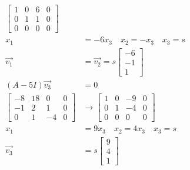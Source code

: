 \documentclass{math}
\begin{document}
\begin{enumerate}[(a)]
\begin{align*}
\begin{bmatrix}
      1 & 0 & 6 & 0 \\
      0 & 1 & 1 & 0 \\
      0 & 0 & 0 & 0
    \end{bmatrix} \\
    x_1 &= -6x_3 \quad x_2 = -x_3 \quad x_3 = s \\
    \vec{v_1} &= \vec{v_2} = s\begin{bmatrix}-6 \\ -1 \\ 1\end{bmatrix} \\
    (A-5I)\vec{v_3} &= 0 \\
    \begin{bmatrix}
      -8 & 18 & 0 & 0 \\
      -1 & 2 & 1 & 0 \\
      0 & 1 & -4 & 0
    \end{bmatrix} &\to \begin{bmatrix}
      1 & 0 & -9 & 0 \\
      0 & 1 & -4 & 0 \\
      0 & 0 & 0 & 0
    \end{bmatrix} \\
    x_1 &= 9x_3 \quad x_2 = 4x_3 \quad x_3 = s \\
    \vec{v_3} &= s\begin{bmatrix}9 \\ 4 \\ 1\end{bmatrix}
  \end{align*}
\end{enumerate}
\end{document}
